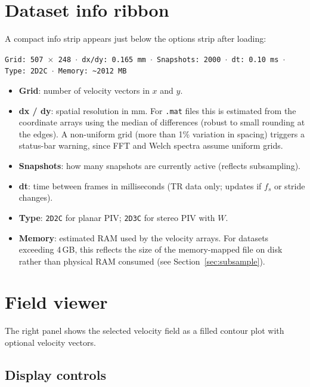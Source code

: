 \documentclass[11pt, a4paper]{report}
\begin{document}
\section{Dataset info ribbon}
\label{sec:datasetinfo}

A compact info strip appears just below the options strip after loading:

\begin{center}
\texttt{Grid: 507\,$\times$\,248 $\cdot$ dx/dy: 0.165\,mm $\cdot$ Snapshots: 2000 $\cdot$ dt: 0.10\,ms $\cdot$ Type: 2D2C $\cdot$ Memory: \textasciitilde{}2012\,MB}
\end{center}

\begin{itemize}[leftmargin=1.5em]
  \item \textbf{Grid}: number of velocity vectors in $x$ and $y$.
  \item \textbf{dx / dy}: spatial resolution in mm. For \texttt{.mat} files this is estimated from the coordinate arrays using the median of differences (robust to small rounding at the edges). A non-uniform grid (more than 1\% variation in spacing) triggers a status-bar warning, since FFT and Welch spectra assume uniform grids.
  \item \textbf{Snapshots}: how many snapshots are currently active (reflects subsampling).
  \item \textbf{dt}: time between frames in milliseconds (TR data only; updates if $f_s$ or stride changes).
  \item \textbf{Type}: \texttt{2D2C} for planar PIV; \texttt{2D3C} for stereo PIV with $W$.
  \item \textbf{Memory}: estimated RAM used by the velocity arrays. For datasets exceeding 4\,GB, this reflects the size of the memory-mapped file on disk rather than physical RAM consumed (see Section~\ref{sec:subsample}).
\end{itemize}

\section{Field viewer}

The right panel shows the selected velocity field as a filled contour plot with optional velocity vectors.

\subsection{Display controls}
\end{document}
